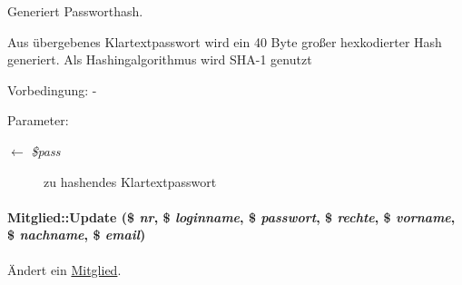 Generiert Passworthash. 

Aus übergebenes Klartextpasswort wird ein 40 Byte großer hexkodierter Hash generiert. Als Hashingalgorithmus wird SHA-1 genutzt \begin{Desc}
\item[Vorbedingung:]- \end{Desc}
\begin{Desc}
\item[Parameter:]
\begin{description}
\item[\mbox{$\leftarrow$} {\em \$pass}]zu hashendes Klartextpasswort \end{description}
\end{Desc}
\hypertarget{classMitglied_5bd2a31b6aeea5c69de9b6de825e11c2}{
\paragraph[Update]{\setlength{\rightskip}{0pt plus 5cm}Mitglied::Update (\$ {\em nr}, \$ {\em loginname}, \$ {\em passwort}, \$ {\em rechte}, \$ {\em vorname}, \$ {\em nachname}, \$ {\em email})}\hfill}
\label{classMitglied_5bd2a31b6aeea5c69de9b6de825e11c2}


Ändert ein \hyperlink{classMitglied}{Mitglied}. 

